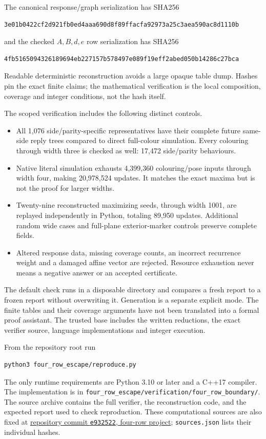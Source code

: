 \documentclass[11pt]{article}
\theoremstyle{definition}\newtheorem{definition}[theorem]{Definition}
\begin{document}
The canonical response/graph serialization has SHA256
\begin{Verbatim}[fontsize=\small]
3e01b0422cf2d921fb0ed4aaa690d8f89ffacfa92973a25c3aea590ac8d1110b
\end{Verbatim}
and the checked $A,B,d,e$ row serialization has SHA256
\begin{Verbatim}[fontsize=\small]
4fb5165094326189694eb227157b578497e089f19eff2abed050b14286c27bca
\end{Verbatim}
Readable deterministic reconstruction avoids a large opaque table dump. Hashes
pin the exact finite claims; the mathematical verification is the local
composition, coverage and integer conditions, not the hash itself.

The scoped verification includes the following distinct controls.
\begin{itemize}
\item All 1,076 side/parity-specific representatives have their complete future
same-side reply trees compared to direct full-colour simulation. Every colouring
through width three is checked as well: 17,472 side/parity behaviours.
\item Native literal simulation exhausts 4,399,360 colouring/pose inputs through
width four, making 20,978,524 updates. It matches the exact maxima but is not the
proof for larger widths.
\item Twenty-nine reconstructed maximizing seeds, through width 1001, are
replayed independently in Python, totaling 89,950 updates. Additional random
wide cases and full-plane exterior-marker controls preserve complete fields.
\item Altered response data, missing coverage counts, an incorrect recurrence
weight and a damaged affine vector are rejected. Resource exhaustion never
means a negative answer or an accepted certificate.
\end{itemize}

The default check runs in a disposable directory and compares a fresh report
to a frozen report without overwriting it. Generation is a separate explicit
mode. The finite tables and their coverage arguments have not been translated
into a formal proof assistant. The trusted base includes the written reductions,
the exact verifier source, language implementations and integer execution.



From the repository root run
\begin{Verbatim}[fontsize=\small]
python3 four_row_escape/reproduce.py
\end{Verbatim}
The only runtime requirements are Python 3.10 or later and a C++17 compiler.
The implementation is in
\texttt{four\_row\_escape/verification/four\_row\_boundary/}.
The source archive contains the full verifier, the reconstruction code,
and the expected report used to check reproduction.
These computational sources are also fixed at
\href{https://github.com/kehao95/langtons-ant-core/tree/e93252230ea9109908c23a009824d72d30fb91e2/four_row_escape}{repository commit \texttt{e932522}, four-row project};
\texttt{sources.json} lists their individual hashes.
\end{document}
